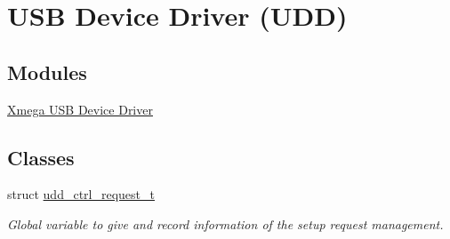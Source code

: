 \hypertarget{group__udd__group}{\section{U\-S\-B Device Driver (U\-D\-D)}
\label{group__udd__group}
}
\subsection*{Modules}
\begin{DoxyCompactItemize}
\item 
\hyperlink{group__udd__xmega__usb__group}{Xmega U\-S\-B Device Driver}
\end{DoxyCompactItemize}
\subsection*{Classes}
\begin{DoxyCompactItemize}
\item 
struct \hyperlink{structudd__ctrl__request__t}{udd\-\_\-ctrl\-\_\-request\-\_\-t}
\begin{DoxyCompactList}\small\item\em Global variable to give and record information of the setup request management. \end{DoxyCompactList}\end{DoxyCompactItemize}
